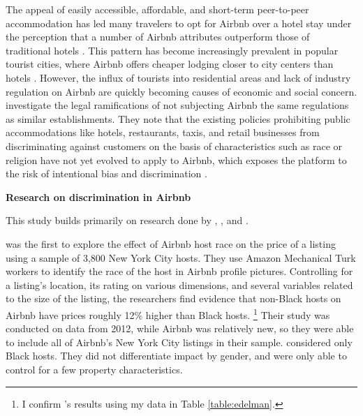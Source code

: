 The appeal of easily accessible, affordable, and short-term peer-to-peer accommodation has led many travelers to opt for Airbnb over a hotel stay under the perception that a number of Airbnb attributes outperform those of traditional hotels \citep{guttentag}. This pattern has become increasingly prevalent in popular tourist cities, where Airbnb offers cheaper lodging closer to city centers than hotels \citep{gutierrez}. However, the influx of tourists into residential areas and lack of industry regulation on Airbnb are quickly becoming causes of economic and social concern. \cite{leong} investigate the legal ramifications of not subjecting Airbnb the same regulations as similar establishments. They note that the existing policies prohibiting public accommodations like hotels, restaurants, taxis, and retail businesses from discriminating against customers on the basis of characteristics such as race or religion have not yet evolved to apply to Airbnb, which exposes the platform to the risk of intentional bias and discrimination \citep{leong}. 




\vspace{5mm}
\textbf{Research on discrimination in Airbnb}

This study builds primarily on research done by \cite{edelman}, \cite{wang}, and \cite{kakar}. 

\cite{edelman} was the first to explore the effect of Airbnb host race on the price of a listing using a sample of 3,800 New York City hosts. They use Amazon Mechanical Turk workers to identify the race of the host in Airbnb profile pictures. Controlling for a listing's location, its rating on various dimensions, and several variables related to the size of the listing, the researchers find evidence that non-Black hosts on Airbnb have prices roughly 12\% higher than Black hosts.%
	\footnote{I confirm \cite{edelman}’s results using my data in Table \ref{table:edelman}.} 
Their study was conducted on data from 2012, while Airbnb was relatively new, so they were able to include all of Airbnb's New York City listings in their sample. \cite{edelman} considered only Black hosts. They did not differentiate impact by gender, and were only able to control for a few property characteristics. 

